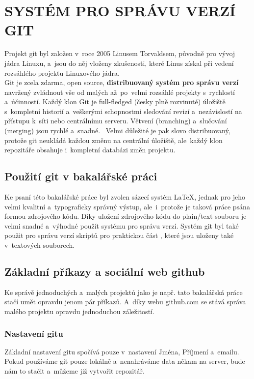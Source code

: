 \documentclass[a4paper,12pt,twoside,BCOR=10mm]{article}
\newcommand{\upc}[1]{\uppercase{#1}} %
\renewcommand{\b}[1]{\textbf{#1}} %
\begin{document}
\section{\upc{Systém pro správu verzí git}}
Projekt git byl založen v~roce 2005 Linusem Torvaldsem, původně pro vývoj jádra Linuxu, a~jsou do něj vloženy zkušenosti, které Linus získal při vedení rozsáhlého projektu Linuxového jádra.~\cite{MailingListVznikGITu}\\
Git je zcela zdarma, open source, \b{distribuovaný systém pro správu verzí} navržený zvládnout vše od malých až~po~velmi rozsáhlé projekty s~rychlostí a~účinností. Každý klon Git je full-fledged (česky plně rozvinuté) úložiště s~kompletní historií a~veškerými schopnostmi sledování revizí a~nezávislostí na přístupu k~síti nebo centrálnímu serveru. Větvení (branching) a~slučování (merging) jsou rychlé a~snadné.~\cite{GITWEB} Velmi důležité je pak slovo distribuovaný, protože git neukládá každou změnu na centrální úložiště, ale~každý klon repozitáře obsahuje i~kompletní databázi změn projektu.

\subsection{Použití git v bakalářské práci}
Ke psaní této bakalářské práce byl zvolen sázecí systém \LaTeX, jednak pro jeho velmi kvalitní a~typograficky správný výstup, ale~i~protože je taková práce psána formou zdrojového kódu. Díky uložení zdrojového kódu do plain/text souboru je velmi snadné a~výhodné použít systému pro správu verzí. Systém git byl také použit pro správu verzí skriptů pro praktickou část , které jsou uloženy také v~textových souborech.

\subsection[Základní příkazy a github]{Základní příkazy a sociální web github}
Ke správě jednoduchých a~malých projektů jako je např. tato bakalářská práce stačí umět opravdu jenom pár příkazů. A~díky webu github.com se stává správa malého projektu opravdu jednoduchou záležitostí.\\

\subsubsection{Nastavení gitu}
Základní nastavení gitu spočívá pouze v~nastavení Jména, Příjmení a~emailu. Pokud používáme git pouze lokálně a~nenahráváme data někam na server, bude nám to stačit a~můžeme již vytvořit repozitář.\\
\end{document}
